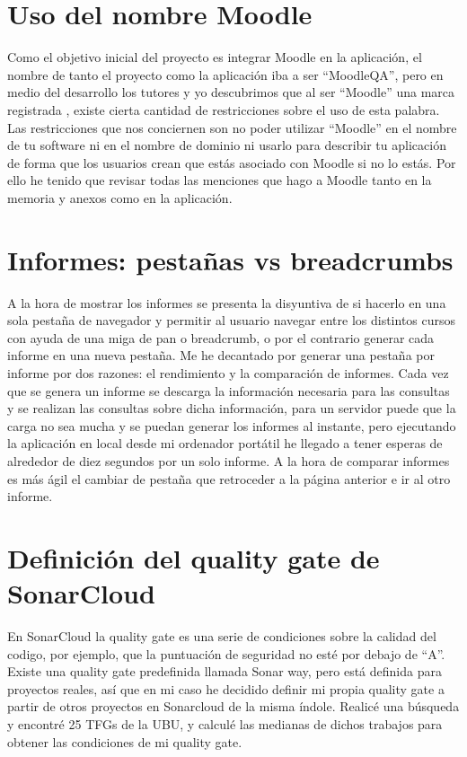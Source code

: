 \section{Uso del nombre Moodle}
Como el objetivo inicial del proyecto es integrar Moodle en la aplicación, el nombre de tanto el proyecto como la aplicación iba a ser ``MoodleQA'', pero en medio del desarrollo los tutores y yo descubrimos que al ser ``Moodle'' una marca registrada \cite{moodletrademark-2022}, existe cierta cantidad de restricciones sobre el uso de esta palabra. Las restricciones que nos conciernen son no poder utilizar ``Moodle'' en el nombre de tu software ni en el nombre de dominio ni usarlo para describir tu aplicación de forma que los usuarios crean que estás asociado con Moodle si no lo estás. Por ello he tenido que revisar todas las menciones que hago a Moodle tanto en la memoria y anexos como en la aplicación.

\section{Informes: pestañas vs breadcrumbs}
A la hora de mostrar los informes se presenta la disyuntiva de si hacerlo en una sola pestaña de navegador y permitir al usuario navegar entre los distintos cursos con ayuda de una miga de pan o breadcrumb, o por el contrario generar cada informe en una nueva pestaña. Me he decantado por generar una pestaña por informe por dos razones: el rendimiento y la comparación de informes. Cada vez que se genera un informe se descarga la información necesaria para las consultas y se realizan las consultas sobre dicha información, para un servidor puede que la carga no sea mucha y se puedan generar los informes al instante, pero ejecutando la aplicación en local desde mi ordenador portátil he llegado a tener esperas de alrededor de diez segundos por un solo informe. A la hora de comparar informes es más ágil el cambiar de pestaña que retroceder a la página anterior e ir al otro informe.

\section{Definición del quality gate de SonarCloud}
En SonarCloud la quality gate es una serie de condiciones sobre la calidad del codigo, por ejemplo, que la puntuación de seguridad no esté por debajo de ``A''. Existe una quality gate predefinida llamada Sonar way, pero está definida para proyectos reales, así que en mi caso he decidido definir mi propia quality gate a partir de otros proyectos en Sonarcloud de la misma índole. Realicé una búsqueda y encontré 25 TFGs de la UBU, y calculé las medianas de dichos trabajos para obtener las condiciones de mi quality gate.

